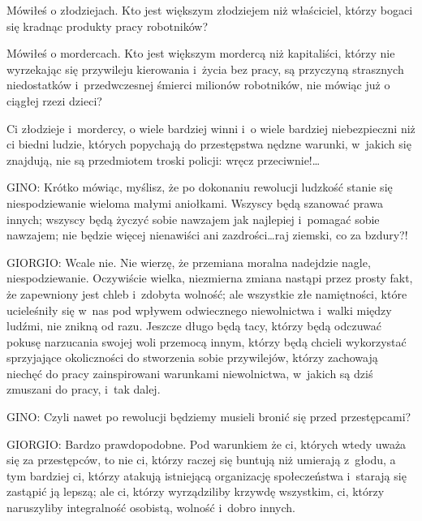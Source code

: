 \documentclass[oneside,polish,11pt,sfheadings]{mwbk}
\begin{document}
 
Mówiłeś o złodziejach. Kto jest większym złodziejem niż właściciel, którzy bogaci się kradnąc produkty pracy
robotników? 

 
Mówiłeś o mordercach. Kto jest większym mordercą niż kapitaliści, którzy nie wyrzekając się przywileju kierowania i~życia bez pracy, są przyczyną strasznych niedostatków i~przedwczesnej śmierci milionów robotników, nie mówiąc już o
ciągłej rzezi dzieci? 

 
Ci złodzieje i~mordercy, o wiele bardziej winni i~o wiele bardziej niebezpieczni niż ci biedni ludzie, których popychają
do przestępstwa nędzne warunki, w~jakich się znajdują, nie są przedmiotem troski policji: wręcz przeciwnie!\ldots 




 
\noindent \noindent GINO: Krótko mówiąc, myślisz, że po dokonaniu rewolucji ludzkość stanie się niespodziewanie wieloma małymi aniołkami.
Wszyscy będą szanować prawa innych; wszyscy będą życzyć sobie nawzajem jak najlepiej i~pomagać sobie nawzajem; nie
będzie więcej nienawiści ani zazdrości\ldots raj ziemski, co za bzdury?! 




 
\noindent GIORGIO: Wcale nie. Nie wierzę, że przemiana moralna nadejdzie nagle, niespodziewanie. Oczywiście wielka, niezmierna
zmiana nastąpi przez prosty fakt, że zapewniony jest chleb i~zdobyta wolność; ale wszystkie złe namiętności, które
ucieleśniły się w~nas pod wpływem odwiecznego niewolnictwa i~walki między ludźmi, nie znikną od razu. Jeszcze długo
będą tacy, którzy będą odczuwać pokusę narzucania swojej woli przemocą innym, którzy będą chcieli wykorzystać
sprzyjające okoliczności do stworzenia sobie przywilejów, którzy zachowają niechęć do pracy zainspirowani warunkami
niewolnictwa, w~jakich są dziś zmuszani do pracy, i~tak dalej. 




 
\noindent \noindent GINO: Czyli nawet po rewolucji będziemy musieli bronić się przed przestępcami? 




 
\noindent GIORGIO: Bardzo prawdopodobne. Pod warunkiem że ci, których wtedy uważa się za przestępców, to nie ci, którzy raczej się
buntują niż umierają z~głodu, a tym bardziej ci, którzy atakują istniejącą organizację społeczeństwa i~starają się
zastąpić ją lepszą; ale ci, którzy wyrządziliby krzywdę wszystkim, ci, którzy naruszyliby integralność osobistą,
wolność i~dobro innych. 
\end{document}
